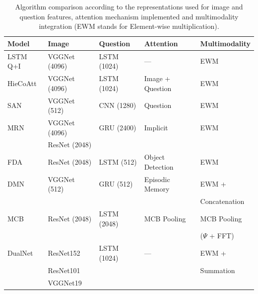 \documentclass{article}
\begin{document}
    \begin{table}[ht]
    	\centering
    	\begin{tabular}{lllll}
    		\toprule
    		Model & Image & Question & Attention & Multimodality\\
    		\midrule
            LSTM Q+I \citep{iccvAntol15} & VGGNet (4096) & LSTM (1024) & --- & EWM \\
            HieCoAtt \citep{nipsLu16} & VGGNet (4096) & LSTM (1024) & Image + Question & EWM \\ 
            SAN \citep{corrYang15} & VGGNet (512) & CNN (1280) & Question & EWM \\
            MRN \citep{DBLP:corrKim16} & VGGNet (4096) & GRU (2400) & Implicit & EWM \\
            & ResNet (2048) & & & \\
            FDA \citep{corrIlievski16} & ResNet (2048) & LSTM (512) & Object Detection & EWM \\
            DMN \citep{corrXiong16} & VGGNet (512) & GRU (512) & Episodic Memory & EWM + \\
            & & & & Concatenation\\ 
            MCB \citep{corrFukui16} & ResNet (2048) & LSTM (2048) & MCB Pooling & MCB Pooling \\
            & & & & ($\Psi$ + FFT) \\ 
            DualNet \citep{corrSaito16} & ResNet152 & LSTM (1024) & --- & EWM + \\
            & ResNet101 & & & Summation\\
            & VGGNet19 & & & \\
    		\bottomrule
    	\end{tabular}
    	\caption{Algorithm comparison according to the representations used for image and question features, attention mechanism implemented and multimodality integration (EWM stands for Element-wise multiplication).}
        \label{algos}
    \end{table}
\end{document}
